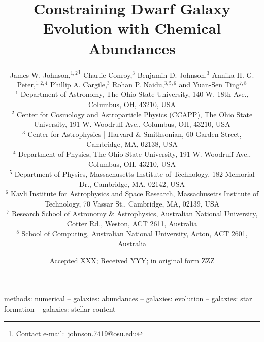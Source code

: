 \documentclass[fleqn, usenatbib]{mnras}
\title[One-Zone Models of Dwarf Galaxies]{Constraining Dwarf Galaxy Evolution
with Chemical Abundances}
\author[J.W. Johnson et al.]{James W. Johnson,$^{1, 2}$\thanks{
	Contact e-mail:~\href{mailto:johnson.7419@osu.edu}{johnson.7419@osu.edu}}
	Charlie Conroy,$^{3}$
	Benjamin D. Johnson,$^{3}$
	Annika H. G. Peter,$^{1, 2, 4}$
	\newauthor
	Phillip A. Cargile,$^{3}$
	Rohan P. Naidu,$^{3, 5, 6}$
	and Yuan-Sen Ting$^{7, 8}$
	\\
	$^{1}$ Department of Astronomy, The Ohio State University,
	140 W. 18th Ave., Columbus, OH, 43210, USA
	\\
	$^{2}$ Center for Cosmology and Astroparticle Physics (CCAPP),
	The Ohio State University, 191 W. Woodruff Ave., Columbus, OH, 43210, USA
	\\
	$^{3}$ Center for Astrophysics | Harvard \& Smithsonian, 60 Garden Street,
	Cambridge, MA, 02138, USA
	\\
	$^{4}$ Department of Physics, The Ohio State University, 191 W. Woodruff
	Ave., Columbus, OH, 43210, USA
	\\
	$^{5}$ Department of Physics, Massachusetts Institute of Technology, 182
	Memorial Dr., Cambridge, MA, 02142, USA
	\\
	$^{6}$ Kavli Institute for Astrophysics and Space Research, Massachusetts
	Institute of Technology, 70 Vassar St., Cambridge, MA, 02139, USA
	\\
	$^{7}$ Research School of Astronomy \& Astrophysics, Australian National
	University, Cotter Rd., Weston, ACT 2611, Australia
	\\
	$^{8}$ School of Computing, Australian National University, Acton, ACT
	2601, Australia
}
\date{Accepted XXX; Received YYY; in original form ZZZ}
\begin{document}
\label{firstpage}
\pagerange{\pageref{firstpage}--\pageref{lastpage}}
\maketitle



\begin{keywords}
methods: numerical -- galaxies: abundances -- galaxies: evolution --
galaxies: star formation -- galaxies: stellar content
\end{keywords}













\begin{appendices}


\end{appendices}

\label{lastpage}
\end{document}
